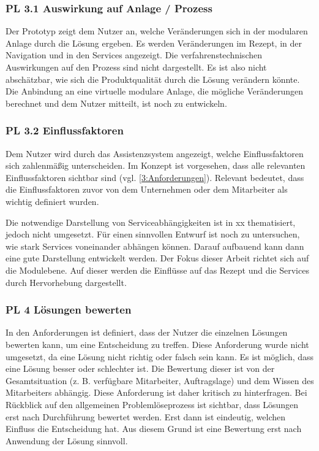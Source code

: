 \subsubsection*{PL 3.1 Auswirkung auf Anlage / Prozess}
Der Prototyp zeigt dem Nutzer an, welche Veränderungen sich in der modularen Anlage durch die Lösung ergeben. Es werden Veränderungen im Rezept, in der Navigation und in den Services angezeigt. Die verfahrenstechnischen Auswirkungen auf den Prozess sind nicht dargestellt. Es ist also nicht abschätzbar, wie sich die Produktqualität durch die Lösung verändern könnte. Die Anbindung an eine virtuelle modulare Anlage, die mögliche Veränderungen berechnet und dem Nutzer mitteilt, ist noch zu entwickeln.

\subsubsection*{PL 3.2 Einflussfaktoren}
Dem Nutzer wird durch das Assistenzsystem angezeigt, welche Einflussfaktoren sich zahlenmäßig unterscheiden. Im Konzept ist vorgesehen, dass alle relevanten Einflussfaktoren sichtbar sind (vgl. \ref{3:Anforderungen}). Relevant bedeutet, dass die Einflussfaktoren zuvor von dem Unternehmen oder dem Mitarbeiter als wichtig definiert wurden.

Die notwendige Darstellung von Serviceabhängigkeiten ist in xx  thematisiert, jedoch nicht umgesetzt. Für einen sinnvollen Entwurf ist noch zu untersuchen, wie stark Services voneinander abhängen können. Darauf aufbauend kann dann eine gute Darstellung entwickelt werden. Der Fokus dieser Arbeit richtet sich auf die Modulebene. Auf dieser werden die Einflüsse auf das Rezept und die Services durch Hervorhebung dargestellt.

\subsubsection*{PL 4 Lösungen bewerten}
In den Anforderungen ist definiert, dass der Nutzer die einzelnen Lösungen bewerten kann, um eine Entscheidung zu treffen. Diese Anforderung wurde nicht umgesetzt, da eine Lösung nicht richtig oder falsch sein kann. Es ist möglich, dass eine Lösung besser oder schlechter ist. Die Bewertung dieser ist von der Gesamtsituation (z. B. verfügbare Mitarbeiter, Auftragslage) und dem Wissen des Mitarbeiters abhängig. Diese Anforderung ist daher kritisch zu hinterfragen. Bei Rückblick auf den allgemeinen Problemlöseprozess ist sichtbar, dass Lösungen erst nach Durchführung bewertet werden. Erst dann ist eindeutig, welchen Einfluss die Entscheidung hat. Aus diesem Grund ist eine Bewertung erst nach Anwendung der Lösung sinnvoll.

